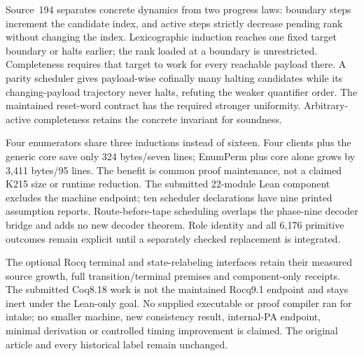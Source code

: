 \documentclass[11pt]{article}
\begin{document}
{Source~194 separates concrete dynamics from two progress laws: boundary steps
increment the candidate index, and active steps strictly decrease pending rank
without changing the index. Lexicographic induction reaches one fixed target
boundary or halts earlier; the rank loaded at a boundary is unrestricted.
Completeness requires that target to work for every reachable payload there.
A parity scheduler gives payload-wise cofinally many halting candidates while
its changing-payload trajectory never halts, refuting the weaker quantifier
order. The maintained reset-word contract has the required stronger uniformity.
Arbitrary-active completeness retains the concrete invariant for soundness.

Four enumerators share three inductions instead of sixteen. Four clients plus
the generic core save only 324 bytes/seven lines; EnumPerm plus core alone grows
by 3,411 bytes/95 lines. The benefit is common proof maintenance, not a claimed
K215 size or runtime reduction. The submitted 22-module Lean component excludes
the machine endpoint; ten scheduler declarations have nine printed assumption
reports. Route-before-tape scheduling overlaps the phase-nine decoder bridge
and adds no new decoder theorem. Role identity and all 6,176 primitive outcomes
remain explicit until a separately checked replacement is integrated.

The optional Rocq terminal and state-relabeling interfaces retain their measured
source growth, full transition/terminal premises and component-only receipts.
The submitted Coq8.18 work is not the maintained Rocq9.1 endpoint and stays inert
under the Lean-only goal. No supplied executable or proof compiler ran for
intake; no smaller machine, new consistency result, internal-PA endpoint,
minimal derivation or controlled timing improvement is claimed. The original
article and every historical label remain unchanged.

}
\end{document}
